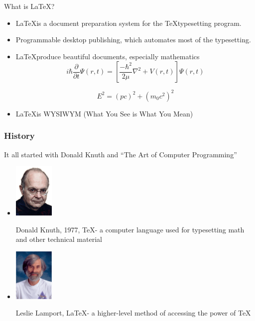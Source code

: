 \documentclass[10pt,times]{beamer}
\begin{document}
\begin{frame}{What is \LaTeX?}
\begin{itemize}
\item \LaTeX is a document preparation system for the \TeX typesetting 
program. 

\item Programmable desktop publishing, which automates most of the typesetting.

\item \LaTeX produce beautiful documents, especially mathematics
\begin{equation*}
i \hbar \frac{\partial}{\partial t} \Psi(r,t) = 
\left[\frac{-\hbar^2}{2\mu}\nabla^2+V(r,t)\right]\Psi(r,t)
\end{equation*}

\begin{equation*}
E^2 = (pc)^2 + (m_0 c^2)^2
\end{equation*}

\item \LaTeX is WYSIWYM (What You See is What You Mean)

\end{itemize}
\end{frame}


\begin{frame}
\frametitle{History}
It all started with Donald Knuth and ``The Art of Computer Programming'' 
\begin{itemize}
\item
\parbox{0.25\textwidth}{
	\includegraphics[width=0.15\textwidth]{figs/Donald_Knuth.png}}
\parbox{0.65\textwidth}{Donald Knuth, 1977, \TeX - a computer language used for 
typesetting math and other technical material}

\item
\parbox{0.25\textwidth}{\includegraphics[width=0.15\textwidth]{figs/Leslie.png}}
\parbox{0.65\textwidth}{Leslie Lamport, \LaTeX - a higher-level method of 
accessing the power of \TeX}
\end{itemize}
\end{frame}
\end{document}
